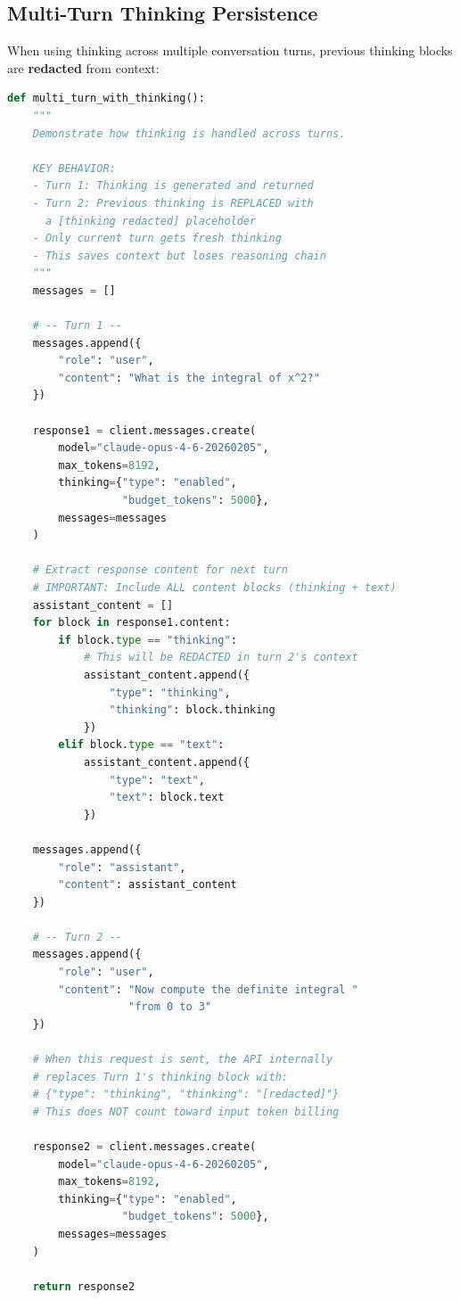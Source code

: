 \documentclass[11pt,a4paper]{article}
\begin{document}
\subsection{Multi-Turn Thinking Persistence}

When using thinking across multiple conversation turns, previous thinking blocks are \textbf{redacted} from context:

\begin{lstlisting}[language=Python, caption={Multi-Turn with Thinking: Redaction Behavior}]
def multi_turn_with_thinking():
    """
    Demonstrate how thinking is handled across turns.
    
    KEY BEHAVIOR:
    - Turn 1: Thinking is generated and returned
    - Turn 2: Previous thinking is REPLACED with 
      a [thinking redacted] placeholder
    - Only current turn gets fresh thinking
    - This saves context but loses reasoning chain
    """
    messages = []
    
    # -- Turn 1 --
    messages.append({
        "role": "user",
        "content": "What is the integral of x^2?"
    })
    
    response1 = client.messages.create(
        model="claude-opus-4-6-20260205",
        max_tokens=8192,
        thinking={"type": "enabled", 
                  "budget_tokens": 5000},
        messages=messages
    )
    
    # Extract response content for next turn
    # IMPORTANT: Include ALL content blocks (thinking + text)
    assistant_content = []
    for block in response1.content:
        if block.type == "thinking":
            # This will be REDACTED in turn 2's context
            assistant_content.append({
                "type": "thinking",
                "thinking": block.thinking
            })
        elif block.type == "text":
            assistant_content.append({
                "type": "text",
                "text": block.text
            })
    
    messages.append({
        "role": "assistant",
        "content": assistant_content
    })
    
    # -- Turn 2 --
    messages.append({
        "role": "user",
        "content": "Now compute the definite integral "
                   "from 0 to 3"
    })
    
    # When this request is sent, the API internally 
    # replaces Turn 1's thinking block with:
    # {"type": "thinking", "thinking": "[redacted]"}
    # This does NOT count toward input token billing
    
    response2 = client.messages.create(
        model="claude-opus-4-6-20260205",
        max_tokens=8192,
        thinking={"type": "enabled", 
                  "budget_tokens": 5000},
        messages=messages
    )
    
    return response2
\end{lstlisting}
\end{document}
